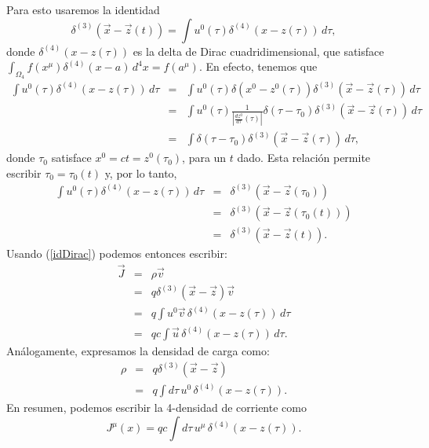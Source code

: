 Para esto usaremos la identidad
\begin{equation}
\boxed{\delta^{(3)}\left(\vec{x}-\vec{z}(t)\right)=\int u^0(\tau)
\delta^{(4)}\left(x-z(\tau)\right)\, d\tau ,} \label{idDirac}
\end{equation}
donde $\delta^{(4)}\left(x-z(\tau)\right)$ es la delta de Dirac
cuadridimensional, que satisface
$\int_{\Omega_4}f(x^\mu)\delta^{(4)}(x-a)\,d^4x=f(a^\mu)$. En efecto, tenemos
que
\begin{eqnarray}
\int u^0(\tau)\delta^{(4)}\left(x-z(\tau)\right)\, d\tau &=&\int
u^0(\tau)\delta(x^0-z^0(\tau))\delta^{(3)}\left(\vec{x}-\vec{z}(\tau)\right)\,
d\tau\\
&=& \int u^0(\tau)\frac{1}{|\frac{dz^0}{d\tau}(\tau)|}\delta(\tau-\tau_0)
\delta^{(3)} \left(\vec {x} -\vec {z } (\tau)\right)\,d\tau \\
&=& \int \delta(\tau-\tau_0) \delta^{(3)} \left(\vec {x} -\vec {z }
(\tau)\right)\,d\tau,
\end{eqnarray}
donde $\tau_0$ satisface $x^0=ct=z^0(\tau_0)$, para un $t$ dado. Esta relación
permite escribir $\tau_0=\tau_0(t)$ y, por lo tanto,
\begin{eqnarray}
\int u^0(\tau)\delta^{(4)}\left(x-z(\tau)\right)\, d\tau &=&
\delta^{(3)}\left(\vec {x} -\vec {z } (\tau_0)\right) \\
&=&\delta^{(3)}\left(\vec {x} -\vec {z}(\tau_0(t))\right)\\
&=&\delta^{(3)}\left(\vec {x} -\vec {z}(t)\right).
\end{eqnarray}
Usando (\ref{idDirac}) podemos entonces escribir:
\begin{eqnarray}
\vec{J}&=&\rho\vec{v}\\
&=&q\delta^{(3)}\left(\vec{x}-\vec{z}\right)\vec{v} \\
&=& q\int u^0\vec{v}\,\delta^{(4)}\left(x-z(\tau)\right)\,d\tau\\
&=& qc\int\vec{u}\,\delta^{(4)}\left(x-z(\tau)\right)\, d\tau .
\end{eqnarray}
Análogamente, expresamos la densidad de carga como:
\begin{eqnarray}
\rho&=&q\delta^{(3)}\left(\vec{x}-\vec{z}\right) \\
&=& q\int d\tau\, u^0\,\delta^{(4)}\left(x-z(\tau)\right).
\end{eqnarray}
En resumen, podemos escribir la 4-densidad de corriente como
\begin{equation}
\boxed{J^\mu(x)=qc\int d\tau\,
u^\mu\,\delta^{(4)}\left(x-z(\tau)\right).} \label{Jcov}
\end{equation}

